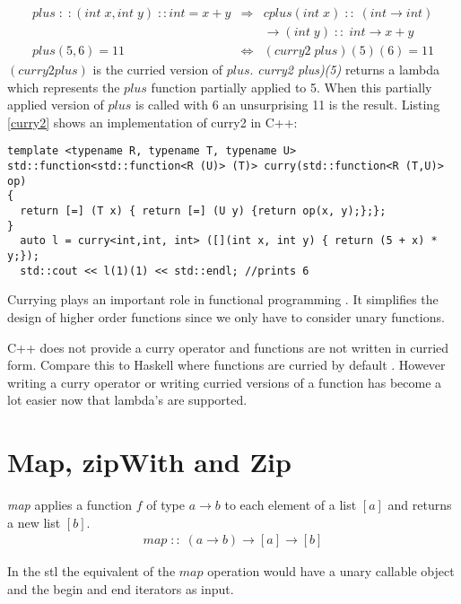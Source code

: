\documentclass[12pt,fleqn]{article}
\begin{document}
\begin{eqnarray*}
plus\;:\;:(int \;x, int \;y) \;::int = x+y &\Rightarrow& cplus(int\; x) \;::\; (int \rightarrow int)  \\
                                                             & & \rightarrow (int \; y) \;::\; int \rightarrow x+y  \\
plus(5,6) = 11 &\Leftrightarrow&(curry2 \; plus)(5)(6) = 11
\end{eqnarray*}
$(curry2 plus)$ is the curried version of $plus$.
{\em curry2 plus)(5)} returns a lambda which represents the $plus$ function partially applied to 5. 
When this partially applied version of $plus$ is called with 6 an unsurprising 11 is the result.
Listing \ref{curry2} shows an implementation of curry2 in C++: 
\begin{lstlisting}[caption=curry for binary operators, label=curry2]
template <typename R, typename T, typename U>
std::function<std::function<R (U)> (T)> curry(std::function<R (T,U)> op)
{
  return [=] (T x) { return [=] (U y) {return op(x, y);};};
}
  auto l = curry<int,int, int> ([](int x, int y) { return (5 + x) * y;});
  std::cout << l(1)(1) << std::endl; //prints 6
\end{lstlisting}
Currying plays an important role in functional programming \cite{field}. 
It simplifies the design of higher order functions since we only have to consider unary functions.

C++ does not provide a curry operator and functions are not written in curried form. 
Compare this to Haskell where functions are curried by default \cite{lipovaca, hutton}.
However writing a curry operator or writing curried versions of a function has become a lot easier now that lambda's are supported.

 
%
\section*{Map, zipWith and Zip}
%
%
{\em map} applies a function $f$ of type $a \rightarrow b$ to each element of a list $[a]$ and returns a new list $[b]$. 
\begin{eqnarray*}
map \;::\; (a \rightarrow b) \rightarrow [a] \rightarrow [b]
\end{eqnarray*}
 
In the stl the equivalent of the $map$ operation would have a unary callable object and the begin and end iterators as input. 
\end{document}
